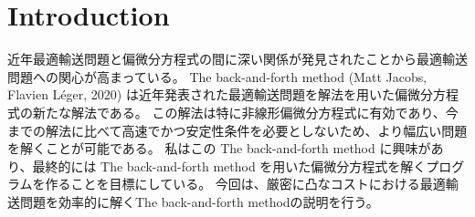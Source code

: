 \documentclass[a4j,10pt, twocolumn]{jarticle}
\begin{document}

\section{Introduction}
近年最適輸送問題と偏微分方程式の間に深い関係が発見されたことから最適輸送問題への関心が高まっている。
The back-and-forth method (Matt Jacobs, Flavien Léger, 2020) は近年発表された最適輸送問題を解法を用いた偏微分方程式の新たな解法である。
この解法は特に非線形偏微分方程式に有効であり、今までの解法に比べて高速でかつ安定性条件を必要としないため、より幅広い問題を解くことが可能である。
私はこの The back-and-forth method に興味があり、最終的には The back-and-forth method を用いた偏微分方程式を解くプログラムを作ることを目標にしている。
今回は、厳密に凸なコストにおける最適輸送問題を効率的に解くThe back-and-forth methodの説明を行う。
\end{document}
